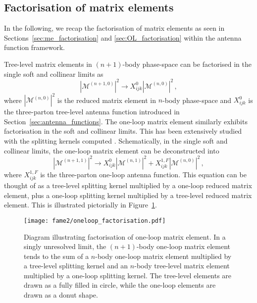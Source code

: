 \documentclass[main.tex]{subfiles}
\begin{document}
\subsection{Factorisation of matrix elements}\label{sec:1L_me_factorisation}
In the following, we recap the factorisation of matrix
elements as seen in Sections~\ref{sec:me_factorisation} and \ref{sec:OL_factorisation}
within the antenna function framework.

Tree-level matrix elements in $(n+1)$-body phase-space
can be factorised in the single soft and collinear limits as
\begin{equation}
    |\mathcal{M}^{(n+1, 0)}|^{2} \longrightarrow X_{ijk}^{0} |\mathcal{M}^{(n, 0)}|^{2} \, ,
    \label{eq:tree_factorisation}
\end{equation}
where $|\mathcal{M}^{(n, 0)}|^{2}$ is the reduced matrix element
in $n$-body phase-space and $X_{ijk}^{0}$ is the three-parton tree-level
antenna function
introduced in Section~\ref{sec:antenna_functions}.
The one-loop matrix element similarly
exhibits factorisation in the soft and collinear limits.
This has been extensively studied \cite{Bern:1994zx,Bern:1995ix,Bern:1999ry,Kosower:1999xi,Kosower:1997zr}
with the splitting kernels computed \cite{Kosower:1997zr,Kosower:2002su,Gehrmann-DeRidder:2005btv}.
Schematically, in the single soft and collinear limits, the one-loop
matrix element can be deconstructed into
\begin{equation}
    |\mathcal{M}^{(n+1, 1)}|^{2} \longrightarrow X_{ijk}^{0} |\mathcal{M}^{(n, 1)}|^{2} + X_{ijk}^{1,F} |\mathcal{M}^{(n, 0)}|^{2} \, ,
    \label{eq:ol_factorisation}
\end{equation}
where $X_{ijk}^{1,F}$ is the three-parton one-loop antenna function.
This equation can be thought of as a tree-level splitting
kernel multiplied by a one-loop reduced matrix element,
plus a one-loop splitting kernel multiplied by a tree-level
reduced matrix element. This is illustrated
pictorially in Figure~\ref{fig:1L_ol_factorisation}.
\begin{figure}
    \texttt{[image: fame2/oneloop\_factorisation.pdf]}
    \caption{Diagram illustrating factorisation of one-loop
    matrix element.
    In a singly unresolved limit, the $(n+1)$-body one-loop matrix
    element tends to the sum of a $n$-body one-loop matrix element
    multiplied by a tree-level splitting kernel and an $n$-body tree-level
    matrix element multiplied by a one-loop splitting kernel.
    The tree-level elements are drawn as a fully filled in
    circle, while the one-loop elements are drawn as a donut shape.}
    \label{fig:1L_ol_factorisation}
\end{figure}
\end{document}
